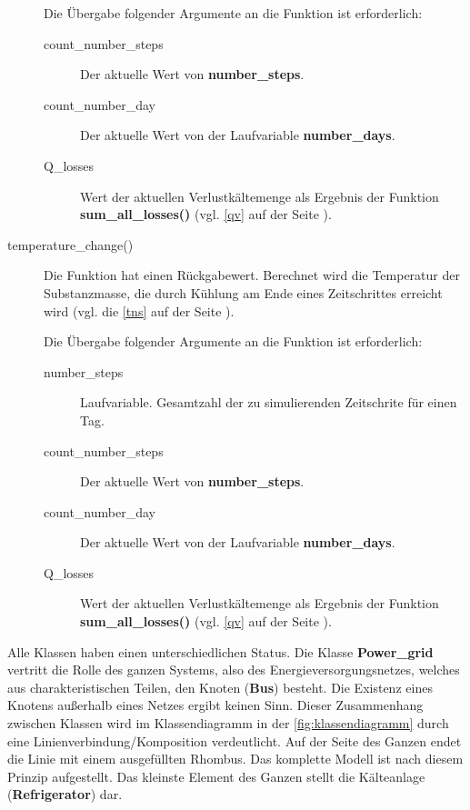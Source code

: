 \begin{description}
	Die \"Ubergabe folgender Argumente an die Funktion ist erforderlich:
	\begin{description}
		\item[count\_number\_steps] Der aktuelle Wert von
		\textbf{number\_steps}.
		\item[count\_number\_day] Der aktuelle Wert von der Laufvariable
		\textbf{number\_days}.
		\item[Q\_losses] Wert der aktuellen Verlustk\"altemenge als
		Ergebnis der Funktion \textbf{sum\_all\_losses()} (vgl.
		\cref{qv} auf der Seite \pageref{qv}).
	\end{description}
	\item[temperature\_change()] Die Funktion hat einen R\"uckgabewert.
	Berechnet wird die Temperatur der Substanzmasse, die durch K\"uhlung am
	Ende eines Zeitschrittes erreicht wird (vgl. die \cref{tns} auf der
	Seite \pageref{tns}).
	
	Die \"Ubergabe folgender Argumente an die Funktion ist erforderlich:
	\begin{description}
		\item[number\_steps] Laufvariable. Gesamtzahl der zu
		simulierenden Zeitschrite f\"ur einen Tag.
		\item[count\_number\_steps] Der aktuelle Wert von
		\textbf{number\_steps}.
		\item[count\_number\_day] Der aktuelle Wert von der Laufvariable
		\textbf{number\_days}.
		\item[Q\_losses] Wert der aktuellen Verlustk\"altemenge als
		Ergebnis der Funktion \textbf{sum\_all\_losses()} (vgl.
		\cref{qv} auf der Seite \pageref{qv}).
	\end{description}
\end{description}

Alle Klassen haben einen unterschiedlichen Status. Die Klasse
\textbf{Power\_grid} vertritt die Rolle des ganzen Systems, also des
Energieversorgungsnetzes, welches aus charakteristischen Teilen, den Knoten
(\textbf{Bus}) besteht. Die Existenz eines Knotens au\ss erhalb eines Netzes
ergibt keinen Sinn. Dieser Zusammenhang zwischen Klassen wird im Klassendiagramm
in der \cref{fig:klassendiagramm} durch eine Linienverbindung/Komposition
verdeutlicht.  Auf der Seite des Ganzen endet die Linie mit einem ausgef\"ullten
Rhombus. Das komplette Modell ist nach diesem Prinzip aufgestellt. Das kleinste
Element des Ganzen stellt die K\"alteanlage (\textbf{Refrigerator}) dar.

